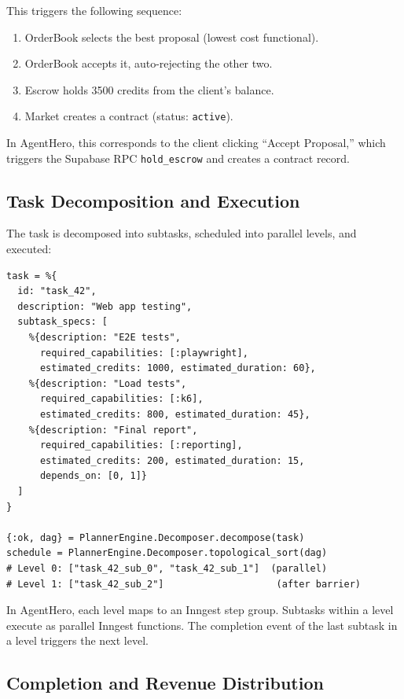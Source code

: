 \documentclass[12pt,a4paper]{article}
\theoremstyle{plain}
\theoremstyle{definition}
\begin{document}
This triggers the following sequence:
\begin{enumerate}
    \item OrderBook selects the best proposal (lowest cost functional).
    \item OrderBook accepts it, auto-rejecting the other two.
    \item Escrow holds 3500 credits from the client's balance.
    \item Market creates a contract (status: \texttt{active}).
\end{enumerate}

In AgentHero, this corresponds to the client clicking ``Accept Proposal,'' which triggers the Supabase RPC \texttt{hold\_escrow} and creates a contract record.

\subsection{Task Decomposition and Execution}

The task is decomposed into subtasks, scheduled into parallel levels, and executed:

\begin{lstlisting}[caption={Decomposition and execution scheduling},label={lst:walk-decompose}]
task = %{
  id: "task_42",
  description: "Web app testing",
  subtask_specs: [
    %{description: "E2E tests",
      required_capabilities: [:playwright],
      estimated_credits: 1000, estimated_duration: 60},
    %{description: "Load tests",
      required_capabilities: [:k6],
      estimated_credits: 800, estimated_duration: 45},
    %{description: "Final report",
      required_capabilities: [:reporting],
      estimated_credits: 200, estimated_duration: 15,
      depends_on: [0, 1]}
  ]
}

{:ok, dag} = PlannerEngine.Decomposer.decompose(task)
schedule = PlannerEngine.Decomposer.topological_sort(dag)
# Level 0: ["task_42_sub_0", "task_42_sub_1"]  (parallel)
# Level 1: ["task_42_sub_2"]                    (after barrier)
\end{lstlisting}

In AgentHero, each level maps to an Inngest step group. Subtasks within a level execute as parallel Inngest functions. The completion event of the last subtask in a level triggers the next level.

\subsection{Completion and Revenue Distribution}
\end{document}
